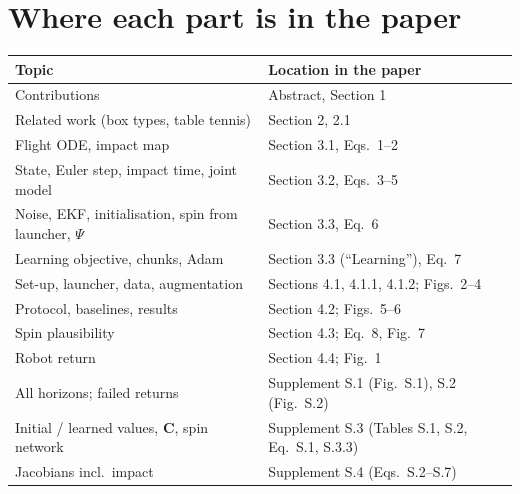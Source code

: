 \documentclass[11pt,a4paper]{article}
\begin{document}
\section{Where each part is in the paper}
\begin{center}\small
\begin{tabular}{ll}
\toprule
Topic & Location in the paper\\
\midrule
Contributions & Abstract, Section 1\\
Related work (box types, table tennis) & Section 2, 2.1\\
Flight ODE, impact map & Section 3.1, Eqs.~1--2\\
State, Euler step, impact time, joint model & Section 3.2, Eqs.~3--5\\
Noise, EKF, initialisation, spin from launcher, $\Psi$ & Section 3.3, Eq.~6\\
Learning objective, chunks, Adam & Section 3.3 (``Learning''), Eq.~7\\
Set-up, launcher, data, augmentation & Sections 4.1, 4.1.1, 4.1.2; Figs.~2--4\\
Protocol, baselines, results & Section 4.2; Figs.~5--6\\
Spin plausibility & Section 4.3; Eq.~8, Fig.~7\\
Robot return & Section 4.4; Fig.~1\\
All horizons; failed returns & Supplement S.1 (Fig.~S.1), S.2 (Fig.~S.2)\\
Initial / learned values, $\mathbf C$, spin network & Supplement S.3 (Tables S.1, S.2, Eq.~S.1, S.3.3)\\
Jacobians incl.\ impact & Supplement S.4 (Eqs.~S.2--S.7)\\
\bottomrule
\end{tabular}
\end{center}
\end{document}
